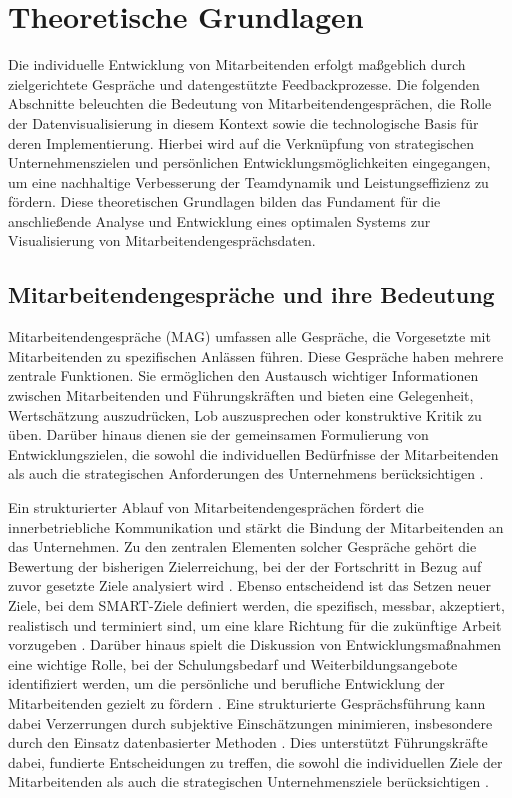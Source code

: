 \chapter{Theoretische Grundlagen}
\label{chap:theoretische-grundlagen}

Die individuelle Entwicklung von Mitarbeitenden erfolgt maßgeblich durch zielgerichtete Gespräche und datengestützte Feedbackprozesse. Die folgenden Abschnitte beleuchten die Bedeutung von Mitarbeitendengesprächen, die Rolle der Datenvisualisierung in diesem Kontext sowie die technologische Basis für deren Implementierung. Hierbei wird auf die Verknüpfung von strategischen Unternehmenszielen und persönlichen Entwicklungsmöglichkeiten eingegangen, um eine nachhaltige Verbesserung der Teamdynamik und Leistungseffizienz zu fördern. Diese theoretischen Grundlagen bilden das Fundament für die anschließende Analyse und Entwicklung eines optimalen Systems zur Visualisierung von Mitarbeitendengesprächsdaten.

\section{Mitarbeitendengespräche und ihre Bedeutung}
Mitarbeitendengespräche (MAG) umfassen alle Gespräche, die Vorgesetzte mit Mitarbeitenden zu spezifischen Anlässen führen. Diese Gespräche haben mehrere zentrale Funktionen. Sie ermöglichen den Austausch wichtiger Informationen zwischen Mitarbeitenden und Führungskräften und bieten eine Gelegenheit, Wertschätzung auszudrücken, Lob auszusprechen oder konstruktive Kritik zu üben. Darüber hinaus dienen sie der gemeinsamen Formulierung von Entwicklungszielen, die sowohl die individuellen Bedürfnisse der Mitarbeitenden als auch die strategischen Anforderungen des Unternehmens berücksichtigen \cite{schober2008}.


Ein strukturierter Ablauf von Mitarbeitendengesprächen fördert die innerbetriebliche Kommunikation und stärkt die Bindung der Mitarbeitenden an das Unternehmen. Zu den zentralen Elementen solcher Gespräche gehört die Bewertung der bisherigen Zielerreichung, bei der der Fortschritt in Bezug auf zuvor gesetzte Ziele analysiert wird \cite{duarte2012performance}. Ebenso entscheidend ist das Setzen neuer Ziele, bei dem SMART-Ziele definiert werden, die spezifisch, messbar, akzeptiert, realistisch und terminiert sind, um eine klare Richtung für die zukünftige Arbeit vorzugeben \cite{duarte2012performance}. Darüber hinaus spielt die Diskussion von Entwicklungsmaßnahmen eine wichtige Rolle, bei der Schulungsbedarf und Weiterbildungsangebote identifiziert werden, um die persönliche und berufliche Entwicklung der Mitarbeitenden gezielt zu fördern \cite{bryson2011employee}. Eine strukturierte Gesprächsführung kann dabei Verzerrungen durch subjektive Einschätzungen minimieren, insbesondere durch den Einsatz datenbasierter Methoden \cite{heikkila2018}. Dies unterstützt Führungskräfte dabei, fundierte Entscheidungen zu treffen, die sowohl die individuellen Ziele der Mitarbeitenden als auch die strategischen Unternehmensziele berücksichtigen \cite{barton2012}.


